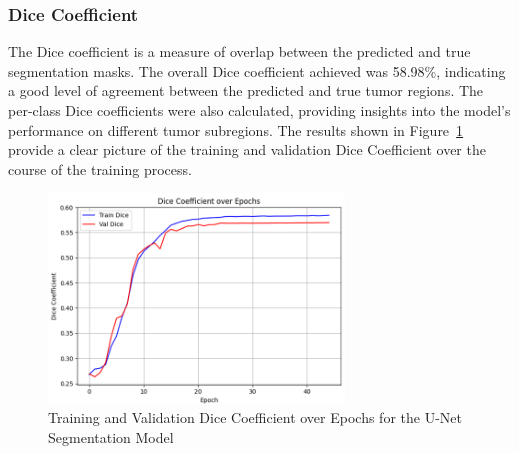 \subsubsection{Dice Coefficient}
The Dice coefficient is a measure of overlap between the predicted and true segmentation masks. The overall Dice coefficient achieved was 58.98\%, indicating a good level of agreement between the predicted and true tumor regions. The per-class Dice coefficients were also calculated, providing insights into the model's performance on different tumor subregions. The results shown in Figure~\ref{fig:unet-dice} provide a clear picture of the training and validation Dice Coefficient over the course of the training process.
\begin{figure}[h]
  \centering
  \includegraphics[width=0.7\textwidth]{Images/Chapter3/unet_dice.png}
  \caption{Training and Validation Dice Coefficient over Epochs for the U-Net Segmentation Model}
  \label{fig:unet-dice}
\end{figure}


